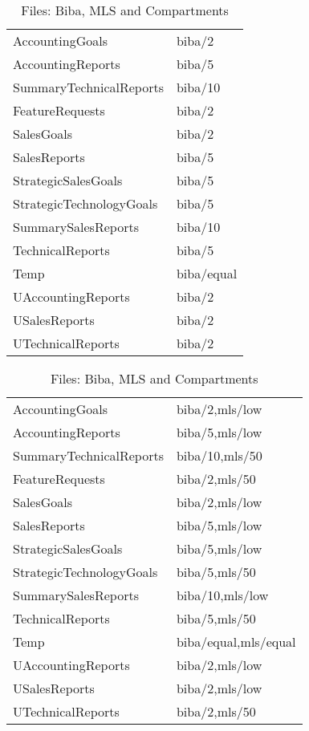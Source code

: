 \documentclass[10pt,a4paper,conference,onecolumn]{IEEEtran}
\begin{document}
\begin{table}[ht]
\parbox[t]{0.29\textwidth}{\caption{Files: Biba}\label{tab:FileLabelsForBibaModel}}
\hfill
\parbox[t]{0.21\textwidth}{\caption{Files: Biba and MLS}\label{tab:FileLabelsForMLSModel}}
\hfill
\parbox[t]{0.35\textwidth}{\caption{Files: Biba, MLS and Compartments}\label{tab:FileLabelsForCompartments}}
\begin{tabular}{|l|l|}\hline
AccountingGoals          & biba/2\\
AccountingReports        & biba/5\\
SummaryTechnicalReports  & biba/10\\
FeatureRequests          & biba/2\\
SalesGoals               & biba/2\\
SalesReports             & biba/5\\
StrategicSalesGoals      & biba/5\\
StrategicTechnologyGoals & biba/5\\
SummarySalesReports      & biba/10\\
TechnicalReports         & biba/5\\
Temp                     & biba/equal\\
UAccountingReports & biba/2\\
USalesReports & biba/2\\
UTechnicalReports & biba/2\\
\hline
\end{tabular}
\hfill
\begin{tabular}{|l|l|}\hline
AccountingGoals & biba/2,mls/low\\
AccountingReports & biba/5,mls/low\\
SummaryTechnicalReports & biba/10,mls/50\\
FeatureRequests & biba/2,mls/50\\
SalesGoals & biba/2,mls/low\\
SalesReports & biba/5,mls/low\\
StrategicSalesGoals & biba/5,mls/low\\
StrategicTechnologyGoals & biba/5,mls/50\\
SummarySalesReports & biba/10,mls/low\\
TechnicalReports & biba/5,mls/50\\
Temp & biba/equal,mls/equal\\
UAccountingReports & biba/2,mls/low\\
USalesReports & biba/2,mls/low\\
UTechnicalReports & biba/2,mls/50\\

\end{tabular}
\end{table}
\end{document}
